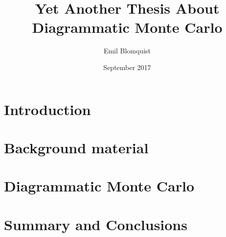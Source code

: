 \documentclass[nocoverpage,swedish,g5paper]{thesis}
\title{Yet Another Thesis About Diagrammatic Monte Carlo}
\author{Emil Blomquist}
\date{September 2017}
\begin{document}
\begin{abstract}

\end{abstract}

\begin{otherlanguage}{swedish}
\begin{foreginabstract}

\end{foreginabstract}
\end{otherlanguage}

\begin{preface}

\end{preface}

\tableofcontents

\mainmatter




\chapter{Introduction}


\chapter{Background material}


\chapter{Diagrammatic Monte Carlo}


\chapter{Summary and Conclusions}


%

\cleardoublepage
{}




%
\end{document}
